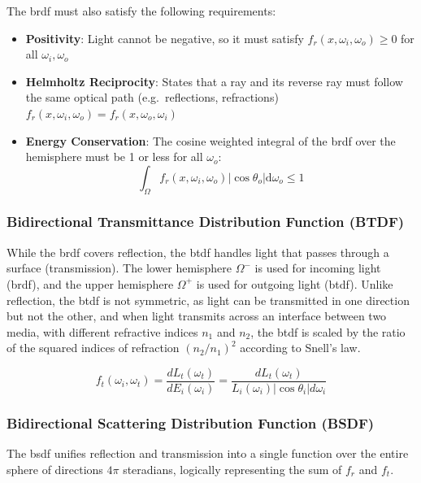The \gls{brdf} must also satisfy the following requirements:
\begin{itemize}
    \item \textbf{Positivity}: Light cannot be negative, so it must satisfy $f_r(x, \omega_i, \omega_o) \geq 0$ for all $\omega_i, \omega_o$
    \item \textbf{Helmholtz Reciprocity}: States that a ray and its reverse ray must follow the same optical path 
        (e.g.\ reflections, refractions) $f_r(x, \omega_i, \omega_o) = f_r(x, \omega_o, \omega_i)$
    \item \textbf{Energy Conservation}: The cosine weighted integral of the \gls{brdf} over the hemisphere must be
            1 or less for all $\omega_o$:
    \[
        \int_{\Omega} f_r(x, \omega_i, \omega_o) |\cos\theta_o| \mathrm{d}\omega_o \leq 1
    \]
\end{itemize}

\subsubsection{Bidirectional Transmittance Distribution Function (BTDF)}\label{subsubsec:btdf}

While the \gls{brdf} covers reflection, the \gls{btdf} handles light that passes through a surface (transmission).
The lower hemisphere $\Omega^-$ is used for incoming light (\gls{brdf}), 
and the upper hemisphere $\Omega^+$ is used for outgoing light (\gls{btdf}).
Unlike reflection, the \gls{btdf} is not symmetric, as light can be transmitted in one direction but not the other,
and when light transmits across an interface between two media, with different refractive indices $n_1$ and $n_2$,
the \gls{btdf} is scaled by the ratio of the squared indices of refraction ${({n_2}/{n_1})}^2$ 
according to Snell's law.~\cite{136913.136929,Born_Wolf_Bhatia_Clemmow_Gabor_Stokes_Taylor_Wayman_Wilcock_1999}

\[
    f_t(\omega_i, \omega_t) = \frac{d L_t(\omega_t)}{d E_i(\omega_i)} = \frac{d L_t(\omega_t)}{L_i(\omega_i) |\cos\theta_i| d\omega_i}
\]


\subsubsection{Bidirectional Scattering Distribution Function (BSDF)}\label{subsubsec:bsdf}

The \gls{bsdf} unifies reflection and transmission into a single function
over the entire sphere of directions $4\pi$ steradians,
logically representing the sum of $f_r$ and $f_t$.~\cite{Bartell1980BSDF,Pharr2016PBR}

